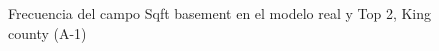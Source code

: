 \begin{figure}[H]
    \centering
    
    \caption{Frecuencia del campo Sqft basement en el modelo real y Top 2, King county (A-1)}
    \label{frecuency-top2-sqft basement}
\end{figure}